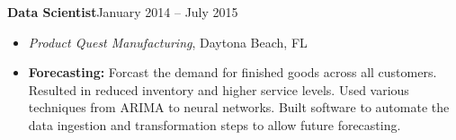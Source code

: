\documentclass[10pt]{article}
\begin{document}
\textbf{Data Scientist}\hfill January 2014 -- July 2015
\begin{itemize}
    \item[] \textit{Product Quest Manufacturing}, Daytona Beach, FL
    \item \textbf{Forecasting:} Forcast the demand for finished goods across all customers. Resulted in reduced inventory and higher service levels. Used various techniques from ARIMA to neural networks. Built software to automate the data ingestion and transformation steps to allow future forecasting.
\end{itemize}

\iffalse
\section*{\textsc{Teaching Experience}}
\textbf{Instructor}
\begin{itemize}[noitemsep]
    \item[] \textit{Johns Hopkins University}, Baltimore, MD
    \begin{itemize}[noitemsep]
        \item EN.550.112: Statistical Analysis II\hfill Summer 2016
    \end{itemize}
    \vspace{1ex}
    \item[] \textit{Daytona State College}, Daytona Beach, FL
    \begin{itemize}[noitemsep]
        \item MAT0028: Mathematics II\hfill Fall 2014
    \end{itemize}
\end{itemize}
\textbf{Teaching Assistant}
\begin{itemize}[noitemsep]
    \item[] \textit{Johns Hopkins University}, Baltimore, MD
    \begin{itemize}[noitemsep]
        \item[] Classes: Optimization in Finance, Discrete Mathematics, Mathematical Game Theory, Introduction to Optimization, and Mathematical Modeling and Consulting
    \end{itemize}
    \vspace{1ex}
    \item[] \textit{Embry-Riddle Aeronautical University}, Daytona Beach, FL
    \begin{itemize}[noitemsep]
        \item[] Classes: Introduction to Scientific Computing and Probability and Statistics
    \end{itemize}
\end{itemize}
\fi
\end{document}
